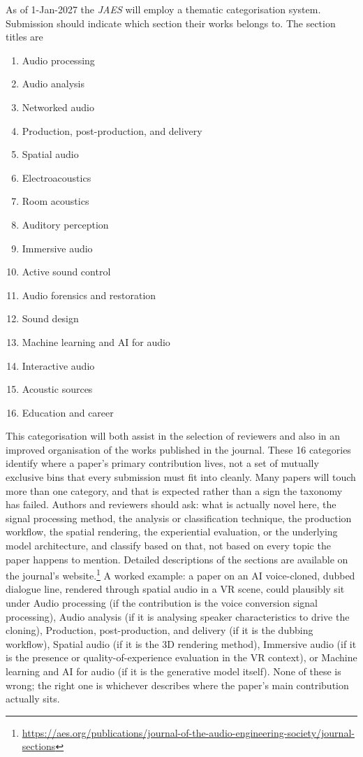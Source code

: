 \documentclass[fleqn]{jaes}
\begin{document}
As of 1-Jan-2027 the \emph{JAES} will employ a thematic categorisation system. Submission should indicate which section their works belongs to. The section titles are 
\begin{enumerate}
    \item Audio processing
    \item Audio analysis
    \item Networked audio
    \item Production, post-production, and delivery
    \item Spatial audio
    \item Electroacoustics
    \item Room acoustics
    \item Auditory perception
    \item Immersive audio
    \item Active sound control
    \item Audio forensics and restoration
    \item Sound design
    \item Machine learning and AI for audio
    \item Interactive audio
    \item Acoustic sources
    \item Education and career
\end{enumerate}
This categorisation will both assist in the selection of reviewers and also in an improved organisation of the works published in the journal. 
These 16 categories identify where a paper's primary contribution lives, not a set of mutually exclusive bins that every submission must fit into cleanly. Many papers will touch more than one category, and that is expected rather than a sign the taxonomy has failed. Authors and reviewers should ask: what is actually novel here, the signal processing method, the analysis or classification technique, the production workflow, the spatial rendering, the experiential evaluation, or the underlying model architecture, and classify based on that, not based on every topic the paper happens to mention. Detailed descriptions of the sections are available on the journal's website.\footnote{\url{https://aes.org/publications/journal-of-the-audio-engineering-society/journal-sections}}
A worked example: a paper on an AI voice-cloned, dubbed dialogue line, rendered through spatial audio in a VR scene, could plausibly sit under Audio processing (if the contribution is the voice conversion signal processing), Audio analysis (if it is analysing speaker characteristics to drive the cloning), Production, post-production, and delivery (if it is the dubbing workflow), Spatial audio (if it is the 3D rendering method), Immersive audio (if it is the presence or quality-of-experience evaluation in the VR context), or Machine learning and AI for audio (if it is the generative model itself). None of these is wrong; the right one is whichever describes where the paper's main contribution actually sits.
\end{document}
